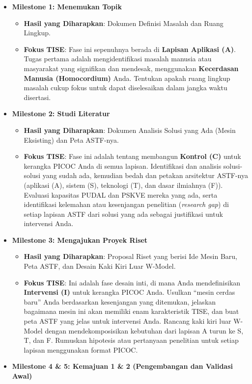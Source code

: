 \documentclass[
  letterpaper,
  DIV=11,
  numbers=noendperiod]{scrreprt}
\providecommand{\tightlist}{%
  \setlength{\itemsep}{0pt}\setlength{\parskip}{0pt}}
\begin{document}
\begin{itemize}
\tightlist
\item
  \textbf{Milestone 1: Menemukan Topik}

  \begin{itemize}
  \tightlist
  \item
    \textbf{Hasil yang Diharapkan}: Dokumen Definisi Masalah dan Ruang
    Lingkup.
  \item
    \textbf{Fokus TISE}: Fase ini sepenuhnya berada di \textbf{Lapisan
    Aplikasi (A)}. Tugas pertama adalah mengidentifikasi masalah manusia
    atau masyarakat yang signifikan dan mendesak, menggunakan
    \textbf{Kecerdasan Manusia (Homocordium)} Anda. Tentukan apakah
    ruang lingkup masalah cukup fokus untuk dapat diselesaikan dalam
    jangka waktu disertasi.
  \end{itemize}
\item
  \textbf{Milestone 2: Studi Literatur}

  \begin{itemize}
  \tightlist
  \item
    \textbf{Hasil yang Diharapkan}: Dokumen Analisis Solusi yang Ada
    (Mesin Eksisting) dan Peta ASTF-nya.
  \item
    \textbf{Fokus TISE}: Fase ini adalah tentang membangun
    \textbf{Kontrol (C)} untuk kerangka PICOC Anda di semua lapisan.
    Identifikasi dan analisis solusi-solusi yang sudah ada, kemudian
    bedah dan petakan arsitektur ASTF-nya (aplikasi (A), sistem (S),
    teknologi (T), dan dasar ilmiahnya (F)). Evaluasi kapasitas PUDAL
    dan PSKVE mereka yang ada, serta identifikasi kelemahan atau
    kesenjangan penelitian (\emph{research gap}) di setiap lapisan ASTF
    dari solusi yang ada sebagai justifikasi untuk intervensi Anda.
  \end{itemize}
\item
  \textbf{Milestone 3: Mengajukan Proyek Riset}

  \begin{itemize}
  \tightlist
  \item
    \textbf{Hasil yang Diharapkan}: Proposal Riset yang berisi Ide Mesin
    Baru, Peta ASTF, dan Desain Kaki Kiri Luar W-Model.
  \item
    \textbf{Fokus TISE}: Ini adalah fase desain inti, di mana Anda
    mendefinisikan \textbf{Intervensi (I)} untuk kerangka PICOC Anda.
    Usulkan ``mesin cerdas baru'' Anda berdasarkan kesenjangan yang
    ditemukan, jelaskan bagaimana mesin ini akan memiliki enam
    karakteristik TISE, dan buat peta ASTF yang jelas untuk intervensi
    Anda. Rancang kaki kiri luar W-Model dengan mendekomposisikan
    kebutuhan dari lapisan A turun ke S, T, dan F. Rumuskan hipotesis
    atau pertanyaan penelitian untuk setiap lapisan menggunakan format
    PICOC.
  \end{itemize}
\item
  \textbf{Milestone 4 \& 5: Kemajuan 1 \& 2 (Pengembangan dan Validasi
  Awal)}


\end{itemize}
\end{document}

